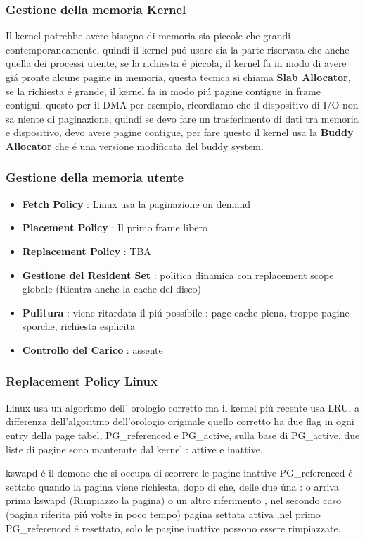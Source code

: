    \subsubsection*{Gestione della memoria Kernel}
    Il kernel potrebbe avere bisogno di memoria sia piccole che grandi contemporaneamente, quindi il kernel puó usare
    sia la parte riservata che anche quella dei processi utente, se la richiesta é piccola, il kernel fa in modo di avere
    giá pronte alcune pagine in memoria, questa tecnica si chiama \textbf{Slab Allocator}, se la richiesta é grande, il kernel
    fa in modo piú pagine contigue in frame contigui, questo per il DMA per esempio, ricordiamo che il dispositivo di I/O
    non sa niente di paginazione, quindi se devo fare un trasferimento di dati tra memoria e dispositivo, devo avere
    pagine contigue, per fare questo il kernel usa la \textbf{Buddy Allocator} che é una versione modificata del buddy system.
    \subsubsection*{Gestione della memoria utente}
    \begin{itemize}
        \item \textbf{Fetch Policy} : Linux usa la paginazione on demand
        \item \textbf{Placement Policy} : Il primo frame libero
        \item \textbf{Replacement Policy} : TBA
        \item \textbf{Gestione del Resident Set} : politica dinamica con replacement scope globale (Rientra anche la cache del disco)
        \item \textbf{Pulitura} : viene ritardata il piú possibile : page cache piena, troppe pagine sporche, richiesta esplicita
        \item \textbf{Controllo del Carico} : assente
    \end{itemize}
    \subsubsection*{Replacement Policy Linux}
    Linux usa un algoritmo dell' orologio corretto ma il kernel piú recente usa LRU, a differenza dell'algoritmo dell'orologio
    originale quello corretto ha due flag in ogni entry della page tabel, PG\_referenced e PG\_active, sulla base
    di PG_active, due liste di pagine sono mantenute dal kernel : attive e inattive.

    kswapd é il demone che si occupa di
    scorrere le pagine inattive PG\_referenced é settato quando la pagina viene richiesta, dopo di che, delle due úna : o arriva prima
    kswapd (Rimpiazzo la pagina) o un altro riferimento , nel secondo caso (pagina riferita piú volte in poco tempo) pagina settata attiva ,nel primo PG\_referenced é resettato, solo le pagine inattive
    possono essere rimpiazzate.

